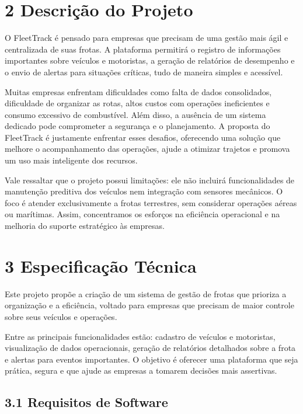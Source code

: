 \documentclass[12pt]{article}
\begin{document}
\section*{2 Descrição do Projeto}
O FleetTrack é pensado para empresas que precisam de uma gestão mais ágil e centralizada de suas frotas. A plataforma permitirá o registro de informações importantes sobre veículos e motoristas, a geração de relatórios de desempenho e o envio de alertas para situações críticas, tudo de maneira simples e acessível.

Muitas empresas enfrentam dificuldades como falta de dados consolidados, dificuldade de organizar as rotas, altos custos com operações ineficientes e consumo excessivo de combustível. Além disso, a ausência de um sistema dedicado pode comprometer a segurança e o planejamento. A proposta do FleetTrack é justamente enfrentar esses desafios, oferecendo uma solução que melhore o acompanhamento das operações, ajude a otimizar trajetos e promova um uso mais inteligente dos recursos.

Vale ressaltar que o projeto possui limitações: ele não incluirá funcionalidades de manutenção preditiva dos veículos nem integração com sensores mecânicos. O foco é atender exclusivamente a frotas terrestres, sem considerar operações aéreas ou marítimas. Assim, concentramos os esforços na eficiência operacional e na melhoria do suporte estratégico às empresas.

\newpage

\section*{3 Especificação Técnica}
Este projeto propõe a criação de um sistema de gestão de frotas que prioriza a organização e a eficiência, voltado para empresas que precisam de maior controle sobre seus veículos e operações.

Entre as principais funcionalidades estão: cadastro de veículos e motoristas, visualização de dados operacionais, geração de relatórios detalhados sobre a frota e alertas para eventos importantes. O objetivo é oferecer uma plataforma que seja prática, segura e que ajude as empresas a tomarem decisões mais assertivas.

\subsection*{3.1 Requisitos de Software}
\end{document}

